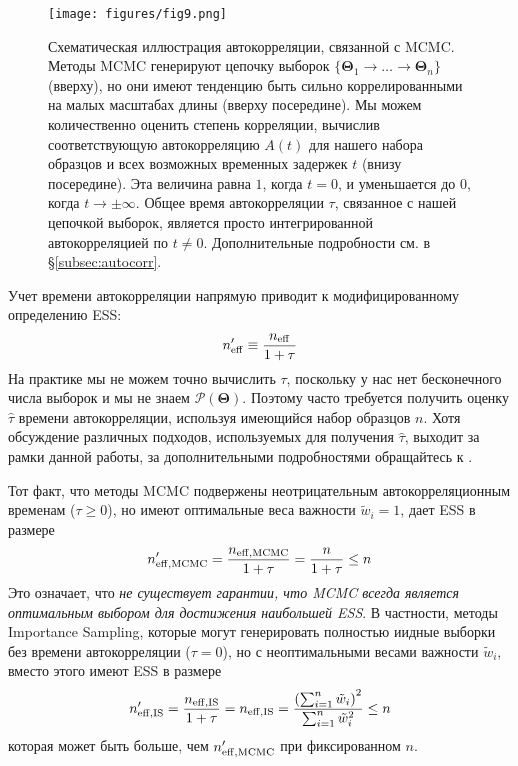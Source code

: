 \documentclass[12pt, titlepage]{article}
\newcommand{\params}{\ensuremath{\boldsymbol\Theta}}
\newcommand{\posterior}{\ensuremath{\mathcal{P}}}
\begin{document}
\begin{figure}
\begin{center}
\texttt{[image: figures/fig9.png]}
\end{center}
\caption{Схематическая иллюстрация автокорреляции, связанной с MCMC. Методы MCMC генерируют цепочку выборок $\{ \params_1 \rightarrow \dots \rightarrow \params_n \}$ (вверху), но они имеют тенденцию быть сильно коррелированными на малых масштабах длины (вверху посередине). Мы можем количественно оценить степень корреляции, вычислив соответствующую автокорреляцию $A(t)$ для нашего набора образцов и всех возможных временных задержек $t$ (внизу посередине). Эта величина равна $1$, когда $t=0$, и уменьшается до $0$, когда $t \rightarrow \pm \infty$. Общее время автокорреляции $\tau$, связанное с нашей цепочкой выборок, является просто интегрированной автокорреляцией по $t \neq 0$. Дополнительные подробности см. в \S\ref{subsec:autocorr}. }\label{fig:autocorr}
\end{figure}

Учет времени автокорреляции напрямую приводит к модифицированному определению ESS:
\begin{equation}
    n_{\rm eff}' \equiv \frac{n_{\rm eff}}{1 + \tau}
\end{equation}
На практике мы не можем точно вычислить $\tau$, поскольку у нас нет бесконечного числа выборок и мы не знаем $\posterior(\params)$. Поэтому часто требуется получить оценку $\hat{\tau}$ времени автокорреляции, используя имеющийся набор образцов $n$. Хотя обсуждение различных подходов, используемых для получения $\hat{\tau}$, выходит за рамки данной работы, за дополнительными подробностями обращайтесь к \citet{brooks+11}.

Тот факт, что методы MCMC подвержены неотрицательным автокорреляционным временам ($\tau \geq 0$), но имеют оптимальные веса важности $\tilde{w}_i = 1$, дает ESS в размере
\begin{equation}
    n_{\rm eff,MCMC}' = \frac{n_{\rm eff,MCMC}}{1 + \tau}
    = \frac{n}{1 + \tau} \leq n
\end{equation}
Это означает, что \textit{не существует гарантии, что MCMC всегда является оптимальным выбором для достижения наибольшей ESS}. В частности, методы Importance Sampling, которые могут генерировать полностью иидные выборки без времени автокорреляции ($\tau = 0$), но с неоптимальными весами важности $\tilde{w}_i$, вместо этого имеют ESS в размере
\begin{equation}
    n_{\rm eff,IS}' = \frac{n_{\rm eff,IS}}{1 + \tau}
    = n_{\rm eff,IS} 
    = \frac{\left(\sum_{i=1}^{n} \tilde{w}_i\right)^2}
    {\sum_{i=1}^{n} \tilde{w}_i^2} \leq n
\end{equation}
которая может быть больше, чем $n_{\rm eff, MCMC}'$ при фиксированном $n$.
\end{document}
